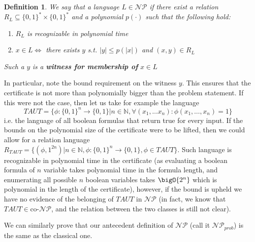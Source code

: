 \documentclass{article}
\newtheorem{definition}{Definition}
\begin{document}
\begin{definition}
We say that a language $L \in \mathcal{NP}$ if there exist a relation $R_L \subseteq \{0, 1\}^* \times \{0, 1\}^*$ and a polynomial $p(\cdot)$ such that the following hold: 
\begin{enumerate}
    \item $R_L$ is recognizable in polynomial time
    \item $x \in L \iff$ there exists $y$ s.t. $|y| \leq p(|x|)$ and $(x, y) \in R_L$
\end{enumerate}
Such a $y$ is a \textbf{witness for membership of } $x \in L$
\end{definition}
In particular, note the bound requirement on the witness $y$. This ensures that the certificate is not more than polynomially bigger than the problem statement. If this were not the case, then let us take for example the language \[TAUT = \{ \phi : \{0,1\}^n \to \{0,1\} | n \in \mathbb{N}, \forall (x_1, \dots x_n): \phi(x_1, \dots, x_n) = 1\}\]
i.e. the language of all boolean formulas that return true for every input. If the bounds on the polynomial size of the certificate were to be lifted, then we could allow for a relation language $R_{TAUT} = \{ (\phi, 1^{2n}) | n \in \mathbb{N}, \phi : \{0,1\}^n \to \{0,1\}, \phi \in TAUT  \}$. Such language is recognizable in polynomial time in the certificate (as evaluating a boolean formula of $n$ variable takes polynomial time in the formula length, and enumerating all possible $n$ boolean variables takes $\bigO{2^n}$ which is polynomial in the length of the certificate), however, if the bound is upheld we have no evidence of the belonging of $TAUT$ in $\mathcal{NP}$ (in fact, we know that $TAUT \in \text{co-}\mathcal{NP}$, and the relation between the two classes is still not clear).

We can similarly prove that our antecedent definition of $\mathcal{NP}$ (call it $\mathcal{NP}_{prob}$) is the same as the classical one. 
\end{document}

